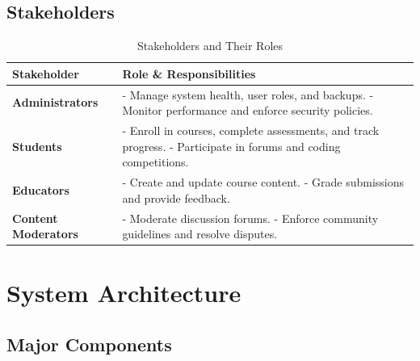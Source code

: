 \documentclass[a4paper, 11pt]{scrreprt}
\begin{document}
\section{Stakeholders}
\begin{table}[htbp]\setlength{\abovecaptionskip}{0pt}
    \centering
    \begin{tabularx}{\textwidth}{|l|X|}
        \hline
        \textbf{Stakeholder} & \textbf{Role \& Responsibilities} \\
        \hline
        \textbf{Administrators} & - Manage system health, user roles, and backups. \newline - Monitor performance and enforce security policies. \\
        \hline
        \textbf{Students} & - Enroll in courses, complete assessments, and track progress. \newline - Participate in forums and coding competitions. \\
        \hline
        \textbf{Educators} & - Create and update course content. \newline - Grade submissions and provide feedback. \\
        \hline
        \textbf{Content Moderators} & - Moderate discussion forums. \newline - Enforce community guidelines and resolve disputes. \\
        \hline
    \end{tabularx}
    \caption{Stakeholders and Their Roles}
\end{table}

\chapter{System Architecture}

\section{Major Components}
\end{document}
